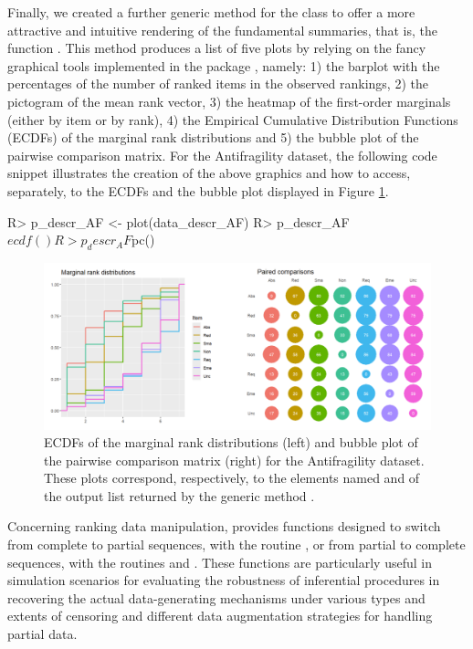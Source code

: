 Finally, we created a further generic method for the class  to offer a more attractive and intuitive rendering of the fundamental summaries, that is, the function . This method produces a list of five plots by relying on the fancy graphical tools implemented in the  package \citep{ggplot}, namely: 1) the barplot with the percentages of the number of ranked items in the observed rankings, 2) the pictogram of the mean rank vector, 3) the heatmap of the first-order marginals (either by item or by rank), 4) the Empirical Cumulative Distribution Functions (ECDFs) of the marginal rank distributions and 5) the bubble plot of the pairwise comparison matrix. For the Antifragility dataset, the following code snippet illustrates the creation of the above graphics and how to access, separately, to the  ECDFs  and the bubble plot displayed in Figure \ref{fig:plot.data_descr}.
\begin{example}
R> p_descr_AF <- plot(data_descr_AF)
R> p_descr_AF$ecdf()
R> p_descr_AF$pc()
\end{example}

\begin{figure}[t]
      \centering
             \includegraphics[width=\textwidth]{figures/RJ2025_paper_plotsanti.png}
          \caption{ECDFs of the marginal rank distributions (left) and bubble plot of the pairwise comparison matrix (right) for the Antifragility dataset. These plots correspond, respectively, to the elements named  and  of the output list returned by the generic method .}
        \label{fig:plot.data_descr}
\end{figure}


Concerning ranking data manipulation,  provides functions designed to switch from complete to partial sequences, with the routine , or from partial to complete sequences, with the routines  and . These functions are particularly useful in simulation scenarios for evaluating the robustness of inferential procedures in recovering the actual data-generating mechanisms under various types and extents of censoring and different data augmentation strategies for handling partial data. 

